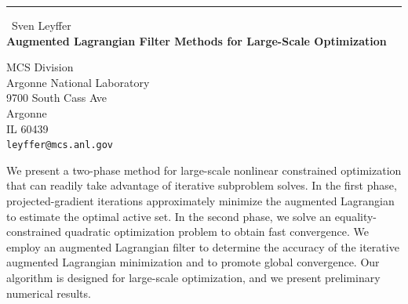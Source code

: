 \documentclass{report}
\begin{document}
\begin{center}
\rule{6in}{1pt} \
{\large Sven Leyffer \\
{\bf Augmented Lagrangian Filter Methods for Large-Scale Optimization }}

MCS Division \\ Argonne National Laboratory \\ 9700 South Cass Ave \\ Argonne \\ IL 60439
\\
{\tt leyffer@mcs.anl.gov}\end{center}

We present a two-phase method for large-scale nonlinear constrained
optimization that can readily take advantage of iterative subproblem
solves. In the first phase, projected-gradient iterations approximately
minimize the augmented Lagrangian to estimate the optimal active set. In
the second phase, we solve an equality-constrained quadratic optimization
problem to obtain fast convergence. We employ an augmented Lagrangian
filter to determine the accuracy of the iterative augmented Lagrangian
minimization and to promote global convergence. Our algorithm is designed
for large-scale optimization, and we present preliminary numerical
results.
\end{document}
